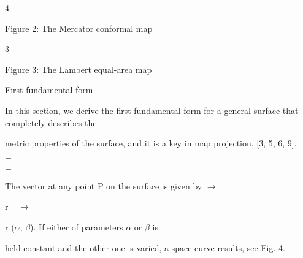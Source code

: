 \documentclass[a4paper,portrait,12pt]{article}
\begin{document}
4





\begin{flushleft}
\newpage
Figure 2: The Mercator conformal map
\end{flushleft}





3





\begin{flushleft}
Figure 3: The Lambert equal-area map
\end{flushleft}





\begin{flushleft}
First fundamental form
\end{flushleft}





\begin{flushleft}
In this section, we derive the first fundamental form for a general surface that completely describes the
\end{flushleft}


\begin{flushleft}
metric properties of the surface, and it is a key in map projection, [3, 5, 6, 9].
\end{flushleft}


$-$


$-$


\begin{flushleft}
The vector at any point P on the surface is given by $\rightarrow$
\end{flushleft}


\begin{flushleft}
r =$\rightarrow$
\end{flushleft}


\begin{flushleft}
r ($\alpha$, $\beta$). If either of parameters $\alpha$ or $\beta$ is
\end{flushleft}


\begin{flushleft}
held constant and the other one is varied, a space curve results, see Fig. 4.
\end{flushleft}
\end{document}
